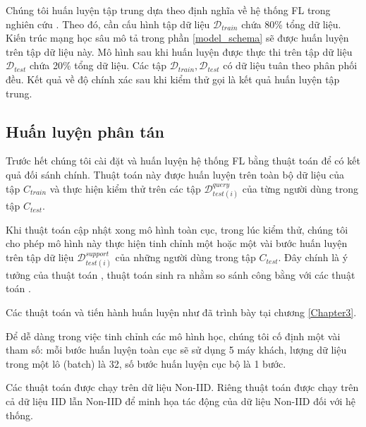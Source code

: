 Chúng tôi huấn luyện tập trung dựa theo định nghĩa về hệ thống FL trong nghiên cứu \cite{yin2021comprehensive}. Theo đó, cần cấu hình tập dữ liệu $\mathcal{D}_{train}$ chứa 80\% tổng dữ liệu. Kiến trúc mạng học sâu mô tả trong phần \ref{model_schema} sẽ được huấn luyện trên tập dữ liệu này. Mô hình sau khi huấn luyện được thực thi trên tập dữ liệu $\mathcal{D}_{test}$ chứa 20\% tổng dữ liệu. Các tập $\mathcal{D}_{train}, \mathcal{D}_{test}$ có dữ liệu tuân theo phân phối đều. Kết quả về độ chính xác sau khi kiểm thử gọi là kết quả huấn luyện tập trung.

\subsection{Huấn luyện phân tán}

Trước hết chúng tôi cài đặt và huấn luyện hệ thống FL bằng thuật toán  để có kết quả đối sánh chính. Thuật toán này được huấn luyện trên toàn bộ dữ liệu của tập $C_{train}$ và thực hiện kiểm thử trên các tập $\mathcal{D}_{test(i)}^{query}$ của từng người dùng trong tập $C_{test}$.

Khi thuật toán  cập nhật xong mô hình toàn cục, trong lúc kiểm thử, chúng tôi cho phép mô hình này thực hiện tinh chỉnh một hoặc một vài bước huấn luyện trên tập dữ liệu $\mathcal{D}_{test(i)}^{support}$ của những người dùng trong tập $C_{test}$. Đây chính là ý tưởng của thuật toán , thuật toán sinh ra nhằm so sánh công bằng với các thuật toán .

Các thuật toán  và  tiến hành huấn luyện như đã trình bày tại chương \ref{Chapter3}.

Để dễ dàng trong việc tinh chỉnh các mô hình học, chúng tôi cố định một vài tham số: mỗi bước huấn luyện toàn cục sẽ sử dụng 5 máy khách, lượng dữ liệu trong một lô (batch) là 32, số bước huấn luyện cục bộ là 1 bước.

Các thuật toán được chạy trên dữ liệu Non-IID. Riêng thuật toán  được chạy trên cả dữ liệu IID lẫn Non-IID để minh họa tác động của dữ liệu Non-IID đối với hệ thống.


